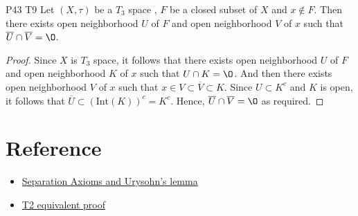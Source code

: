 \begin{exercise}{P43 T9}{}
    Let $(X,\tau)$ be a $T_3$ space , $F$ be a closed subset of $X$ and $x\notin F$. Then 
    there exists open neighborhood $U$ of $F$ and open neighborhood $V$ of $x$ such that $\overline{U}\cap \overline{V}=\O$. 
\end{exercise}
\begin{proof}
    Since $X$ is $T_3$ space, it follows that 
    there exists open neighborhood $U$ of $F$ and open neighborhood $K$ of $x$ such that $U\cap K=\O$.
    And then there exists open neighborhood $V$ of $x$ such that $x\in V\subset \overline{V}\subset K$.
    Since $U\subset K^c$ and $K$ is open, it follows that $\overline{U}\subset (\text{Int}(K))^c=K^c$.
    Hence, $\overline{U}\cap \overline{V}=\O$ as required.
    

\end{proof}

\section{Reference}

\begin{itemize}
    \item \href{http://staff.ustc.edu.cn/~wangzuoq/Courses/21S-Topology/Notes/Lec14.pdf}{Separation Axioms and Urysohn's lemma}
    \item \href{https://math.stackexchange.com/questions/902851/show-that-x-is-hausdorff-if-and-only-if-the-diagonal-delta-x-xx-in?noredirect=1&lq=1}{T2 equivalent proof}
\end{itemize}